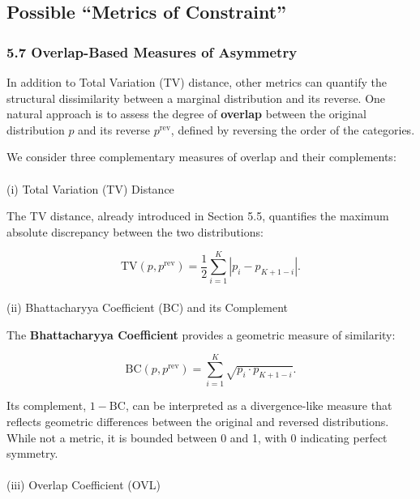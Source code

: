 \documentclass[
  12pt,
]{article}
\makeatletter
\let\oldparagraph\paragraph
\renewcommand{\paragraph}{
    \@ifstar
      \xxxParagraphStar
      \xxxParagraphNoStar
  }
\newcommand{\xxxParagraphStar}[1]{\oldparagraph*{#1}\mbox{}}
\newcommand{\xxxParagraphNoStar}[1]{\oldparagraph{#1}\mbox{}}
\theoremstyle{plain}
\theoremstyle{definition}
\theoremstyle{remark}
\makeatother
\begin{document}
\subsection{Possible ``Metrics of
Constraint''}\label{possible-metrics-of-constraint}

\subsubsection{5.7 Overlap-Based Measures of
Asymmetry}\label{overlap-based-measures-of-asymmetry}

In addition to Total Variation (TV) distance, other metrics can quantify
the structural dissimilarity between a marginal distribution and its
reverse. One natural approach is to assess the degree of
\textbf{overlap} between the original distribution \(p\) and its reverse
\(p^{\mathrm{rev}}\), defined by reversing the order of the categories.

We consider three complementary measures of overlap and their
complements:

\paragraph{(i) Total Variation (TV)
Distance}\label{i-total-variation-tv-distance}

The TV distance, already introduced in Section 5.5, quantifies the
maximum absolute discrepancy between the two distributions:

\[
\text{TV}(p, p^{\mathrm{rev}}) = \frac{1}{2} \sum_{i=1}^{K} \left| p_i - p_{K+1 - i} \right|.
\]

\paragraph{(ii) Bhattacharyya Coefficient (BC) and its
Complement}\label{ii-bhattacharyya-coefficient-bc-and-its-complement}

The \textbf{Bhattacharyya Coefficient} provides a geometric measure of
similarity:

\[
\text{BC}(p, p^{\mathrm{rev}}) = \sum_{i=1}^{K} \sqrt{ p_i \cdot p_{K+1 - i} }.
\]

Its complement, \(1 - \text{BC}\), can be interpreted as a
divergence-like measure that reflects geometric differences between the
original and reversed distributions. While not a metric, it is bounded
between 0 and 1, with 0 indicating perfect symmetry.

\paragraph{(iii) Overlap Coefficient
(OVL)}\label{iii-overlap-coefficient-ovl}
\end{document}
